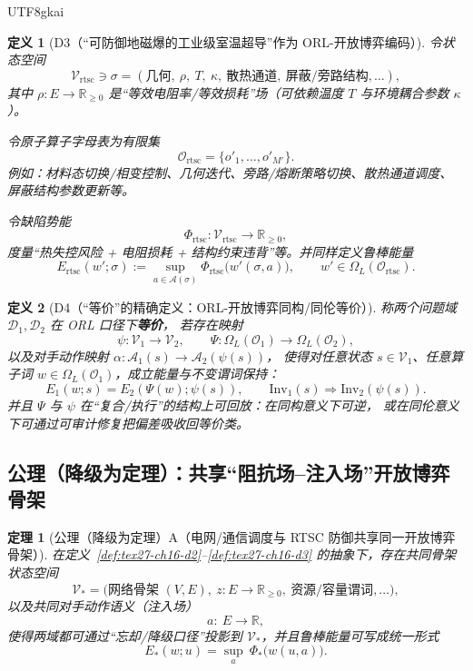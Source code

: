 \documentclass[12pt]{article}
\newtheorem{definition}{定义}[section]
\newtheorem{theorem}{定理}[section]
\newcommand{\RR}{\mathbb{R}}
\begin{document}
\begin{CJK*}{UTF8}{gkai}
\begin{definition}[D3（“可防御地磁爆的工业级室温超导”作为 ORL-开放博弈编码）]
令状态空间
\[
  \mathcal{V}_{\mathrm{rtsc}}\ni
  \sigma=(\text{几何},\ \rho,\ T,\ \kappa,\ \text{散热通道},\ \text{屏蔽/旁路结构},\dots),
\]
其中 $\rho:E\to\RR_{\ge 0}$ 是“等效电阻率/等效损耗”场（可依赖温度 $T$ 与环境耦合参数 $\kappa$）。

令原子算子字母表为有限集
\[
  \mathcal{O}_{\mathrm{rtsc}}=\{o'_1,\dots,o'_{M'}\}.
\]
例如：材料态切换/相变控制、几何迭代、旁路/熔断策略切换、散热通道调度、屏蔽结构参数更新等。

令缺陷势能
\[
  \Phi_{\mathrm{rtsc}}:\mathcal{V}_{\mathrm{rtsc}}\to\RR_{\ge 0},
\]
度量“热失控风险 + 电阻损耗 + 结构约束违背”等。并同样定义鲁棒能量
\[
  E_{\mathrm{rtsc}}(w';\sigma)
  :=\sup_{a\in\mathcal{A}(\sigma)}\Phi_{\mathrm{rtsc}}\bigl(w'(\sigma,a)\bigr),
  \qquad
  w'\in\Omega_L(\mathcal{O}_{\mathrm{rtsc}}).
\]
\end{definition}

\begin{definition}[D4（“等价”的精确定义：ORL-开放博弈同构/同伦等价）]
\label{def:tex27-ch16-d4}
称两个问题域 $\mathcal{D}_1,\mathcal{D}_2$ 在 ORL 口径下\textbf{等价}，
若存在映射
\[
  \psi:\mathcal{V}_1\to\mathcal{V}_2,\qquad
  \Psi:\Omega_L(\mathcal{O}_1)\to\Omega_L(\mathcal{O}_2),
\]
以及对手动作映射 $\alpha:\mathcal{A}_1(s)\to\mathcal{A}_2(\psi(s))$，
使得对任意状态 $s\in\mathcal{V}_1$、任意算子词 $w\in\Omega_L(\mathcal{O}_1)$，成立能量与不变谓词保持：
\[
  E_1(w;s)=E_2(\Psi(w);\psi(s)),
  \qquad
  \mathrm{Inv}_1(s)\Rightarrow \mathrm{Inv}_2(\psi(s)).
\]
并且 $\Psi$ 与 $\psi$ 在“复合/执行”的结构上可回放：在同构意义下可逆，
或在同伦意义下可通过可审计修复把偏差吸收回等价类。
\end{definition}

\subsection{公理（降级为定理）：共享“阻抗场--注入场”开放博弈骨架}
\label{subsec:tex27-ch16-axiom}

\begin{theorem}[公理（降级为定理）A（电网/通信调度与 RTSC 防御共享同一开放博弈骨架）]
\label{thm:tex27-ch16-a}
在定义~\ref{def:tex27-ch16-d2}--\ref{def:tex27-ch16-d3} 的抽象下，存在共同骨架状态空间
\[
  \mathcal{V}_\ast=
  \bigl(\text{网络骨架 }(V,E),\ z:E\to\RR_{\ge 0},\ \text{资源/容量谓词},\dots\bigr),
\]
以及共同对手动作语义（注入场）
\[
  a:\ E\to\RR,
\]
使得两域都可通过“忘却/降级口径”投影到 $\mathcal{V}_\ast$，并且鲁棒能量可写成统一形式
\[
  E_\ast(w;u)=\sup_{a}\ \Phi_\ast\bigl(w(u,a)\bigr).
\]
\end{theorem}


\end{CJK*}
\end{document}
